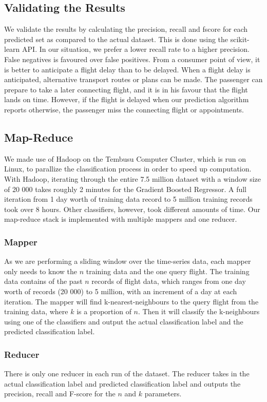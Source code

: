 \documentclass[letterpaper,11pt]{article}
\begin{document}
\subsection{Validating the Results}
We validate the results by calculating the precision, recall and fscore for each predicted set as compared to the actual dataset. This is done using the scikit-learn API. In our situation, we prefer a lower recall rate to a higher precision. False negatives is favoured over false positives. From a consumer point of view, it is better to anticipate a flight delay than to be delayed. When a flight delay is anticipated, alternative transport routes or plans can be made. The passenger can prepare to take a later connecting flight, and it is in his favour that the flight lands on time. However, if the flight is delayed when our prediction algorithm reports otherwise, the passenger miss the connecting flight or  appointments. 

\subsection{Map-Reduce} 
We made use of Hadoop on the Tembusu Computer Cluster, which is run on Linux, to parallize the classification process in order to speed up computation. With Hadoop, iterating through the entire 7.5 million dataset with a window size of 20 000 takes roughly 2 minutes for the Gradient Boosted Regressor. A full iteration from 1 day worth of training data record to 5 million training records took over 8 hours. Other classifiers, however, took different amounts of time. Our map-reduce stack is implemented with multiple mappers and one reducer. 
\subsubsection{Mapper}
As we are performing a sliding window over the time-series data, each mapper only needs to know the $n$ training data and the one query flight. The training data contains of the past $n$ records of flight data, which ranges from one day worth of records (20 000) to 5 million, with an increment of a day at each iteration. The mapper will find k-nearest-neighbours to the query flight from the training data, where $k$ is a proportion of $n$. Then it will classify the k-neighbours using one of the classifiers and output the actual classification label and the predicted classification label. 

\subsubsection{Reducer}
There is only one reducer in each run of the dataset. The reducer takes in the actual classification label and predicted classification label and outputs the precision, recall and F-score for the $n$ and $k$ parameters. 
\end{document}

